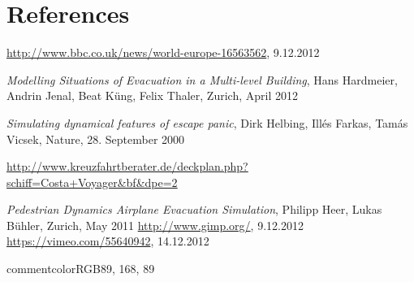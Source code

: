 \documentclass[11pt]{article}
\begin{document}
\newpage
\section{References}



\begingroup 
\renewcommand{\section}[2]{}%
\begin{thebibliography}{9}

		\url{http://www.bbc.co.uk/news/world-europe-16563562}, 9.12.2012

	\emph{Modelling Situations of Evacuation
in a Multi-level Building}, 
Hans Hardmeier, Andrin Jenal, Beat K\"ung, Felix Thaler, Zurich, April 2012

		\emph{Simulating dynamical features of escape panic},
		Dirk Helbing, Ill\'es Farkas, Tam\'as Vicsek, Nature, 28. September 2000

		\url{http://www.kreuzfahrtberater.de/deckplan.php?schiff=Costa+Voyager&bf&dpe=2}

		\emph{Pedestrian Dynamics Airplane Evacuation Simulation},
		Philipp Heer, Lukas Bühler, Zurich, May 2011
		\url{http://www.gimp.org/}, 9.12.2012
		\url{https://vimeo.com/55640942}, 14.12.2012
\end{thebibliography}
\endgroup

\newpage
\section{Appendix}

\definecolor{commentcolor}{RGB}{89, 168, 89}
\end{document}
